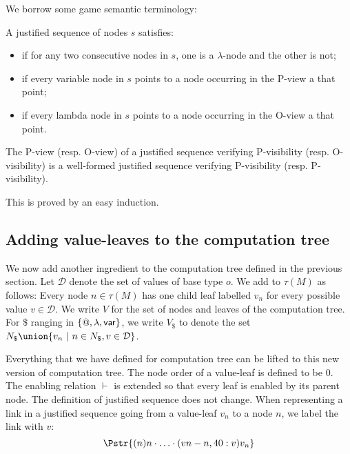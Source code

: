 We borrow some game semantic terminology:
\begin{definition} A justified sequence of nodes $s$ satisfies:
\begin{itemize}[-]
\item {} if for any two consecutive nodes in $s$, one is a $\lambda$-node
and the other is not;
\item {} if every variable node in $s$ points to a node occurring in the P-view a that point;
\item  {} if every lambda node in $s$ points to a node occurring in the O-view a that point.
\end{itemize}
\end{definition}

\begin{property}
\label{proper:pview_visibility}
The P-view (resp. O-view) of a justified sequence verifying P-visibility (resp. O-visibility)
is a well-formed justified sequence verifying P-visibility (resp. P-visibility).
\end{property}
This is proved by an easy induction.




\subsection{Adding value-leaves to the computation tree}
\label{sec:adding_value_leaves}

We now add another ingredient to the computation tree defined in
the previous section. Let $\mathcal{D}$
denote the set of values of base type $o$.  We add
 to $\tau(M)$ as follows: Every node $n \in \tau(M)$ has one child leaf labelled $v_n$ for every possible value $v \in \mathcal{D}$.
We write $V$ for the set of nodes and leaves of
the computation tree.  For $\$$ ranging in $\{@, \lambda, {\sf var} \}$,
we write $V_\$$ to denote the set $N_\$ \union \{ v_n \ | \ n \in
N_\$, v \in \mathcal{D} \}$.

Everything that we have defined for computation tree can be lifted
to this new version of computation tree. The node order of a
value-leaf is defined to be $0$. The enabling relation $\vdash$ is
extended so that every leaf is enabled by its parent node. The
definition of justified sequence does not change.
When representing a link in a justified sequence going from a value-leaf $v_n$ to a node $n$,
we label the link with $v$:
$$
\Pstr{ (n){n} \cdot \ldots \cdot (vn-n,40:v){v_n} }
$$

